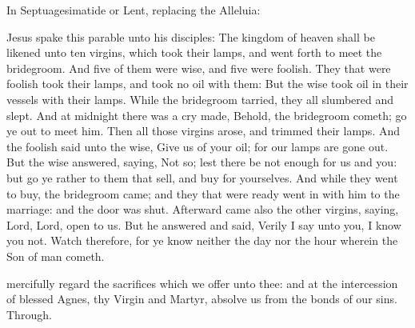 
\begin{rubric}
{In Septuagesimatide or Lent, replacing the Alleluia:}
\end{rubric}\par\noindent
{}

 Jesus spake this parable unto his disciples: The kingdom of heaven shall be likened unto ten virgins, which took their lamps, and went forth to meet the bridegroom. And five of them were wise, and five were foolish. They that were foolish took their lamps, and took no oil with them:  But the wise took oil in their vessels with their lamps. While the bridegroom tarried, they all slumbered and slept. And at midnight there was a cry made, Behold, the bridegroom cometh; go ye out to meet him. Then all those virgins arose, and trimmed their lamps. And the foolish said unto the wise, Give us of your oil; for our lamps are gone out. But the wise answered, saying, Not so; lest there be not enough for us and you: but go ye rather to them that sell, and buy for yourselves. And while they went to buy, the bridegroom came; and they that were ready went in with him to the marriage: and the door was shut. Afterward came also the other virgins, saying, Lord, Lord, open to us. But he answered and said, Verily I say unto you, I know you not. Watch therefore, for ye know neither the day nor the hour wherein the Son of man cometh.


\secret
{} mercifully regard the sacrifices which we offer unto thee: and at the intercession of blessed Agnes, thy Virgin and Martyr, absolve us from the bonds of our sins. Through.

